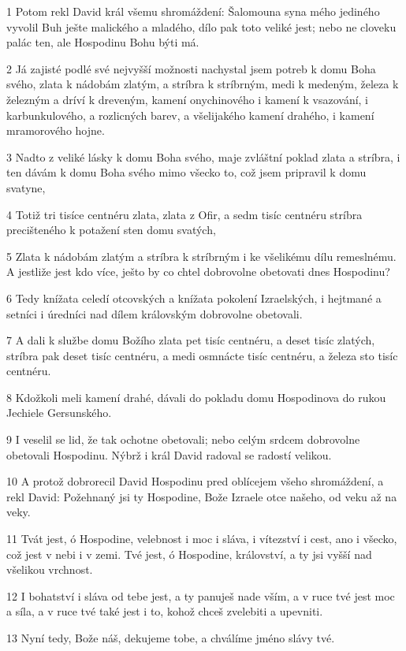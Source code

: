 \par 1 Potom rekl David král všemu shromáždení: Šalomouna syna mého jediného vyvolil Buh ješte malického a mladého, dílo pak toto veliké jest; nebo ne cloveku palác ten, ale Hospodinu Bohu býti má.
\par 2 Já zajisté podlé své nejvyšší možnosti nachystal jsem potreb k domu Boha svého, zlata k nádobám zlatým, a stríbra k stríbrným, medi k medeným, železa k železným a dríví k dreveným, kamení onychinového i kamení k vsazování, i karbunkulového, a rozlicných barev, a všelijakého kamení drahého, i kamení mramorového hojne.
\par 3 Nadto z veliké lásky k domu Boha svého, maje zvláštní poklad zlata a stríbra, i ten dávám k domu Boha svého mimo všecko to, což jsem pripravil k domu svatyne,
\par 4 Totiž tri tisíce centnéru zlata, zlata z Ofir, a sedm tisíc centnéru stríbra precišteného k potažení sten domu svatých,
\par 5 Zlata k nádobám zlatým a stríbra k stríbrným i ke všelikému dílu remeslnému. A jestliže jest kdo více, ješto by co chtel dobrovolne obetovati dnes Hospodinu?
\par 6 Tedy knížata celedí otcovských a knížata pokolení Izraelských, i hejtmané a setníci i úredníci nad dílem královským dobrovolne obetovali.
\par 7 A dali k službe domu Božího zlata pet tisíc centnéru, a deset tisíc zlatých, stríbra pak deset tisíc centnéru, a medi osmnácte tisíc centnéru, a železa sto tisíc centnéru.
\par 8 Kdožkoli meli kamení drahé, dávali do pokladu domu Hospodinova do rukou Jechiele Gersunského.
\par 9 I veselil se lid, že tak ochotne obetovali; nebo celým srdcem dobrovolne obetovali Hospodinu. Nýbrž i král David radoval se radostí velikou.
\par 10 A protož dobrorecil David Hospodinu pred oblícejem všeho shromáždení, a rekl David: Požehnaný jsi ty Hospodine, Bože Izraele otce našeho, od veku až na veky.
\par 11 Tvát jest, ó Hospodine, velebnost i moc i sláva, i vítezství i cest, ano i všecko, což jest v nebi i v zemi. Tvé jest, ó Hospodine, království, a ty jsi vyšší nad všelikou vrchnost.
\par 12 I bohatství i sláva od tebe jest, a ty panuješ nade vším, a v ruce tvé jest moc a síla, a v ruce tvé také jest i to, kohož chceš zvelebiti a upevniti.
\par 13 Nyní tedy, Bože náš, dekujeme tobe, a chválíme jméno slávy tvé.
